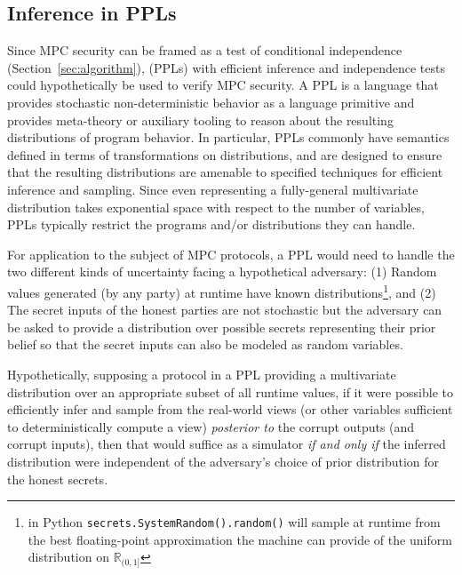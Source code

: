 \documentclass[compsoc, conference, a4paper, 10pt, times]{IEEEtran}
\begin{document}
\subsection{Inference in PPLs}

Since MPC security can be framed as a test of conditional independence
(Section~\ref{sec:algorithm}),
 (PPLs) with efficient inference and independence tests could hypothetically be used to verify MPC security.
%
A PPL is a language that provides stochastic non-deterministic behavior as a language primitive
and provides meta-theory or auxiliary tooling to reason about the resulting distributions of program behavior.
In particular, PPLs commonly have semantics defined in terms of transformations on distributions,
and are designed to ensure that the resulting distributions are amenable to specified techniques for efficient
inference and sampling. Since even representing a fully-general multivariate distribution takes exponential space with respect to the number of variables,
PPLs typically restrict the programs and/or distributions they can handle.

For application to the subject of MPC protocols, a PPL would need to handle the two different kinds of uncertainty facing a hypothetical adversary:
(1) Random values generated (by any party) at runtime have known distributions\footnote{
    \eg{} in Python \texttt{secrets.SystemRandom().random()}
    will sample at runtime from the best floating-point approximation the machine can provide
    of the uniform distribution on $\mathbb{R}_{(0,1]}$
}, and
(2) The secret inputs of the honest parties are not stochastic but the adversary can be asked to provide a distribution over
possible secrets representing their prior belief so that the secret inputs can also be modeled as random variables.

Hypothetically, supposing a protocol in a PPL providing a multivariate distribution over an appropriate subset of all runtime values,
if it were possible to efficiently infer and sample from the real-world views
(or other variables sufficient to deterministically compute a view)
\textit{posterior to} the corrupt outputs (and corrupt inputs),
then that would suffice as a simulator
\textit{if and only if} the inferred distribution were independent of the adversary's choice of prior distribution for the honest secrets.
\end{document}
